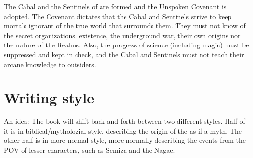 The Cabal and the Sentinels of \Miith{} are formed and the Unspoken Covenant is adopted. The Covenant dictates that the Cabal and Sentinels strive to keep mortals ignorant of the true world that surrounds them. They must not know of the secret organizations' existence, the underground war, their own origins nor the nature of the Realms. Also, the progress of science (including magic) must be suppressed and kept in check, and the Cabal and Sentinels must not teach their arcane knowledge to outsiders. 















\section{Writing style}
An idea: The book will shift back and forth between two different styles. Half of it is in biblical/mythologial style, describing the origin of the \dragons{} as if a myth. The other half is in more normal style, more normally describing the events from the POV of lesser characters, such as Semiza and the Nagae. 



% 
% 
